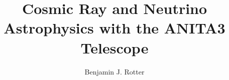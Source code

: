 \documentclass[11pt]{uhthesis}
\title{Cosmic Ray and Neutrino Astrophysics with the ANITA3 Telescope}
\author{Benjamin J. Rotter}
\begin{document}
\maketitle

\begin{frontmatter}



%

%



\tableofcontents



\end{frontmatter}




%




%
\end{document}
